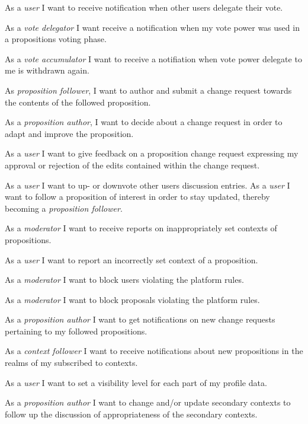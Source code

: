  As a \textit{user} I want to receive notification when other users delegate their vote.

 As a \textit{vote delegator} I want receive a notification when my vote power was used in a propositions voting phase.

 As a \textit{vote accumulator} I want to receive a notifiation when vote power delegate to me is withdrawn again.

 As \textit{proposition follower}, I want to author and submit a change request towards the contents of the followed proposition.

 As a \textit{proposition author}, I want to decide about a change request in order to adapt and improve the proposition.

 As a \textit{user} I want to give feedback on a proposition change request expressing my approval or rejection of the edits contained within the change request.

 As a \textit{user} I want to up- or downvote other users discussion entries.
 As a \textit{user} I want to follow a proposition of interest in order to stay updated, thereby becoming a \textit{proposition follower}.

 As a \textit{moderator} I want to receive reports on inappropriately set contexts of propositions.

 As a \textit{user} I want to report an incorrectly set context of a proposition.

 As a \textit{moderator} I want to block users violating the platform rules.

 As a \textit{moderator} I want to block proposals violating the platform rules.

 As a \textit{proposition author} I want to get notifications on new change requests pertaining to my followed propositions.

 As a \textit{context follower} I want to receive notifications about new propositions in the realms of my subscribed to contexts.

 As a \textit{user} I want to set a visibility level for each part of my profile data.

 As a \textit{proposition author} I want to change and/or update secondary contexts to follow up the discussion of appropriateness of the secondary contexts.

